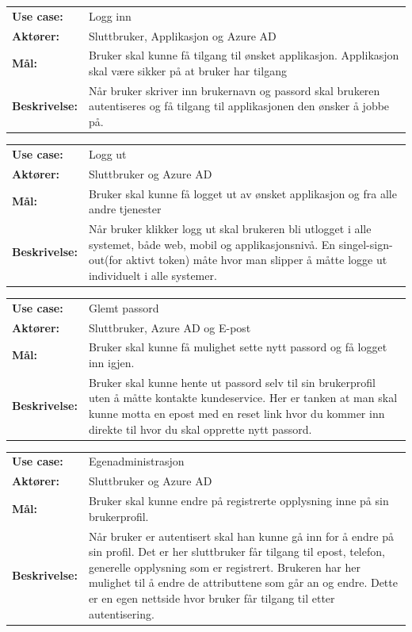 \begin{framed}
    \begin{tabular}{l p{9cm}}
        \textbf{Use case:} & Logg inn \\
        \textbf{Aktører:} & Sluttbruker, Applikasjon og Azure AD \\
        \textbf{Mål:} & Bruker skal kunne få tilgang til ønsket applikasjon. Applikasjon skal være sikker på at bruker har tilgang \\
        \textbf{Beskrivelse:} & Når bruker skriver inn brukernavn og passord skal brukeren autentiseres og få tilgang til applikasjonen den ønsker å jobbe på.
    \end{tabular}
\end{framed}
\begin{framed}
    \begin{tabular}{l p{9cm}}
        \textbf{Use case:} & Logg ut \\
        \textbf{Aktører:} & Sluttbruker og Azure AD \\
        \textbf{Mål:} & Bruker skal kunne få logget ut av ønsket applikasjon og fra alle andre tjenester \\
        \textbf{Beskrivelse:} &  Når bruker klikker logg ut skal brukeren bli utlogget i alle systemet, både web, mobil og applikasjonsnivå. En singel-sign-out(for aktivt token) måte hvor man slipper å måtte logge ut individuelt i alle systemer.
    \end{tabular}
\end{framed}
\begin{framed}
    \begin{tabular}{l p{9cm}}
        \textbf{Use case:} & Glemt passord \\
        \textbf{Aktører:} & Sluttbruker, Azure AD og E-post \\
        \textbf{Mål:} & Bruker skal kunne få mulighet sette nytt passord og få logget inn igjen. \\
        \textbf{Beskrivelse:} &  Bruker skal kunne hente ut passord selv til sin brukerprofil uten å måtte kontakte kundeservice. Her er tanken at man skal kunne motta en epost med en reset link hvor du kommer inn direkte til hvor du skal opprette nytt passord.
    \end{tabular}
\end{framed}
\begin{framed}
    \begin{tabular}{l p{9cm}}
        \textbf{Use case:} & Egenadministrasjon \\
        \textbf{Aktører:} & Sluttbruker og Azure AD \\
        \textbf{Mål:} &  Bruker skal kunne endre på registrerte opplysning inne på sin brukerprofil. \\
        \textbf{Beskrivelse:} &  Når bruker er autentisert skal han kunne gå inn for å endre på sin profil. Det er her sluttbruker får tilgang til epost, telefon, generelle opplysning som er registrert. Brukeren har her mulighet til å endre de attributtene som går an og endre. Dette er en egen nettside hvor bruker får tilgang til etter autentisering.
    \end{tabular}
\end{framed}

